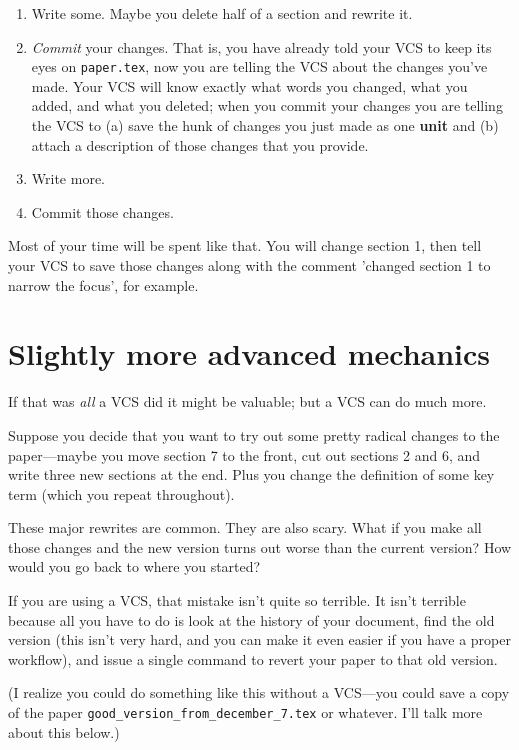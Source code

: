 \documentclass{article}
\begin{document}
\begin{enumerate}
\item
  Write some. Maybe you delete half of a section and rewrite it.
\item
  \emph{Commit} your changes. That is, you have already told your VCS 
  to keep its eyes on \lstinline!paper.tex!, now you are telling the VCS 
  about the changes you've made. Your VCS will know exactly what words 
  you changed, what you added, and what you deleted; when you commit 
  your changes you are telling the VCS to (a) save the hunk of changes 
  you just made as one \textbf{unit} and (b) attach a description of 
  those changes that you provide.
\item
  Write more.
\item
  Commit those changes.
\end{enumerate}
Most of your time will be spent like that. You will change section 1, 
then tell your VCS to save those changes along with the comment 
'changed section 1 to narrow the focus', for example.

\section{Slightly more advanced mechanics}

If that was \emph{all} a VCS did it might be valuable; but a VCS can 
do much more.

Suppose you decide that you want to try out some pretty radical 
changes to the paper—maybe you move section 7 to the front, cut out 
sections 2 and 6, and write three new sections at the end. Plus you 
change the definition of some key term (which you repeat throughout).

These major rewrites are common. They are also scary. What if you make 
all those changes and the new version turns out worse than the current 
version? How would you go back to where you started?

If you are using a VCS, that mistake isn't quite so terrible. It isn't 
terrible because all you have to do is look at the history of your 
document, find the old version (this isn't very hard, and you can make 
it even easier if you have a proper workflow), and issue a single 
command to revert your paper to that old version.

(I realize you could do something like this without a VCS—you could 
save a copy of the paper \lstinline!good_version_from_december_7.tex! or 
whatever. I'll talk more about this below.)
\end{document}
